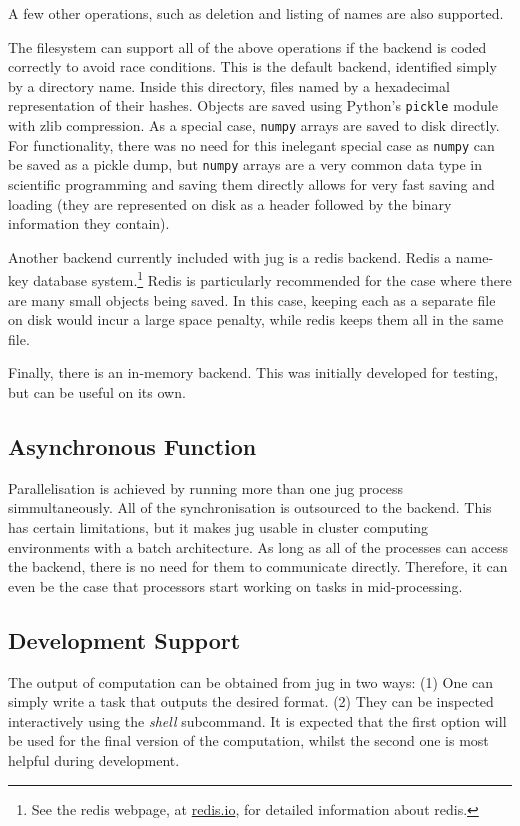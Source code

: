 \documentclass{article}
\let\code\texttt
\begin{document}
A few other operations, such as deletion and listing of names are also
supported.

The filesystem can support all of the above operations if the backend is coded
correctly to avoid race conditions. This is the default backend, identified
simply by a directory name. Inside this directory, files named by a hexadecimal
representation of their hashes. Objects are saved using Python's \code{pickle}
module with zlib compression. As a special case, \code{numpy} arrays
\citep{numpy} are saved to disk directly. For functionality, there was no need
for this inelegant special case as \code{numpy} can be saved as a pickle dump,
but \code{numpy} arrays are a very common data type in scientific programming
and saving them directly allows for very fast saving and loading (they are
represented on disk as a header followed by the binary information they
contain).

Another backend currently included with jug is a redis backend. Redis a
name-key database system.\footnote{See the redis webpage, at
\href{http://redis.io}{redis.io}, for detailed information about redis.} Redis
is particularly recommended for the case where there are many small objects
being saved. In this case, keeping each as a separate file on disk would incur
a large space penalty, while redis keeps them all in the same file.

Finally, there is an in-memory backend. This was initially developed for
testing, but can be useful on its own.

\subsection{Asynchronous Function}

Parallelisation is achieved by running more than one jug process
simmultaneously. All of the synchronisation is outsourced to the backend. This
has certain limitations, but it makes jug usable in cluster computing
environments with a batch architecture. As long as all of the processes can
access the backend, there is no need for them to communicate directly.
Therefore, it can even be the case that processors start working on tasks in
mid-processing.

\subsection{Development Support}


The output of computation can be obtained from jug in two ways: (1) One can
simply write a task that outputs the desired format. (2) They can be inspected
interactively using the \emph{shell} subcommand. It is expected that the first
option will be used for the final version of the computation, whilst the second
one is most helpful during development.
\end{document}
